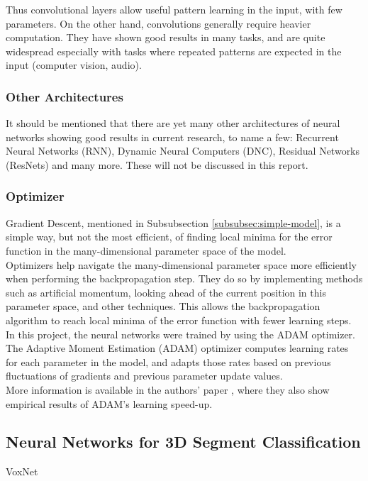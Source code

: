Thus convolutional layers allow useful pattern learning in the input, with few parameters. On the other hand, convolutions generally require heavier computation. They have shown good results in many tasks, and are quite widespread especially with tasks where repeated patterns are expected in the input (computer vision, audio).\\

\subsubsection{Other Architectures}

It should be mentioned that there are yet many other architectures of neural networks showing good results in current research, to name a few: Recurrent Neural Networks (RNN), Dynamic Neural Computers (DNC), Residual Networks (ResNets) and many more. These will not be discussed in this report.\\

\subsubsection{Optimizer}

Gradient Descent, mentioned in Subsubsection \ref{subsubsec:simple-model}, is a simple way, but not the most efficient, of finding local minima for the error function in the many-dimensional parameter space of the model.\\

Optimizers help navigate the many-dimensional parameter space more efficiently when performing the backpropagation step. They do so by implementing methods such as artificial momentum, looking ahead of the current position in this parameter space, and other techniques. This allows the backpropagation algorithm to reach local minima of the error function with fewer learning steps.\\

In this project, the neural networks were trained by using the ADAM optimizer. The Adaptive Moment Estimation (ADAM) optimizer computes learning rates for each parameter in the model, and adapts those rates based on previous fluctuations of gradients and previous parameter update values.\\

More information is available in the authors' paper \cite{adam}, where they also show empirical results of ADAM's learning speed-up. 

\subsection{Neural Networks for 3D Segment Classification}
\label{subsec:voxnet}
VoxNet

